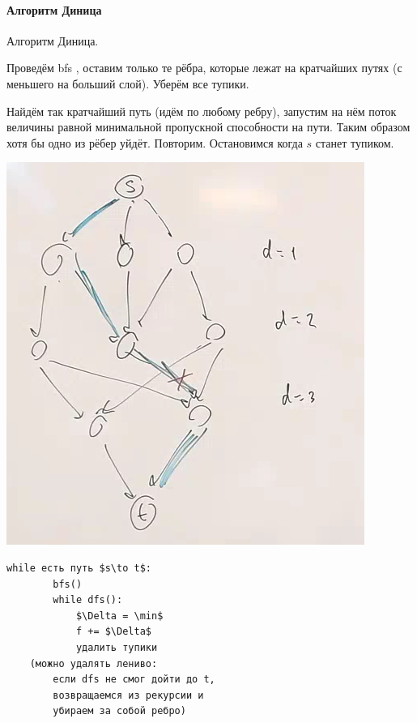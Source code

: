 \paragraph{Алгоритм Диница}

\begin{definition}
    Алгоритм Диница.

    Проведём  bfs , оставим только те  рёбра, которые лежат на кратчайших путях (с меньшего на больший слой). Уберём все тупики.

    Найдём так кратчайший путь (идём по любому ребру), запустим на нём поток величины равной минимальной пропускной способности на пути. 
    Таким образом хотя бы одно из рёбер уйдёт. Повторим. Остановимся когда $s$ станет тупиком.
        
\end{definition}

\begin{center}
    \includegraphics[scale=0.7]{img/dinitsa_algoritm}    
\end{center}

\begin{lstlisting}[mathescape=true]
    while есть путь $s\to t$:
        bfs()
        while dfs():
            $\Delta = \min$
            f += $\Delta$
            удалить тупики 
    (можно удалять лениво: 
        если dfs не смог дойти до t, 
        возвращаемся из рекурсии и 
        убираем за собой ребро)
\end{lstlisting}

